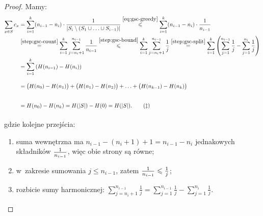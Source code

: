 \begin{obowiazkowy}
\begin{proof}
		Mamy:
		\begin{align*}
			\sum_{x \in S} c_x & = \sum_{i = 1}^{k} (n_{i-1} - n_i) \cdot \frac{1}{|S_i \setminus (S_1 \cup \ldots \cup S_{i-1})|} \overset{\eqref{eq:gsc-greedy}}{\leq} \sum_{i = 1}^{k} (n_{i-1} - n_i) \cdot \frac{1}{n_{i-1}}                                                                                                                                       \\
			                   & \overset{\ref{step:gsc-count}}{=} \sum_{i = 1}^{k} \sum_{j = n_i + 1}^{n_{i-1}} \frac{1}{n_{i-1}} \overset{\ref{step:gsc-bound}}{\leq} \sum_{i = 1}^{k} \sum_{j = n_i + 1}^{n_{i-1}} \frac{1}{j} \overset{\ref{step:gsc-split}}{=} \sum_{i = 1}^{k} \left( \sum_{j = 1}^{n_{i-1}} \frac{1}{j} - \sum_{j = 1}^{n_i} \frac{1}{j} \right) \\
			                   & = \sum_{i = 1}^{k} \left( H(n_{i-1}) - H(n_i) \right)                                                                                                                                                                                                                                                                                  \\
			                   & = \vphantom{\sum_{i = 1}^{k} \left( H(n_{i-1}) - H(n_i) \right)}\big( H(n_0) - H(n_1) \big) + \big( H(n_1) - H(n_2) \big) + \ldots + \big( H(n_{k-1}) - H(n_k) \big)                                                                                                                                                                   \\
			                   & = \vphantom{\sum_{i = 1}^{k} \left( H(n_{i-1}) - H(n_i) \right)} H(n_0) - H(n_k) = H(|S|) - H(0) = H(|S|). \tag{$\ddagger$}\label{eq:gsc-cost}
		\end{align*}
		gdzie kolejne przejścia:
		\begin{enumerate}[label=(\arabic*), nosep]
			\item\label{step:gsc-count} suma wewnętrzna ma $n_{i-1} - (n_i + 1) + 1 = n_{i-1} - n_i$ jednakowych składników $\frac{1}{n_{i-1}}\vphantom{\sum_{j = n_i + 1}^{n_{i-1}}}$, więc obie strony są równe;
			\item\label{step:gsc-bound} w~zakresie sumowania $j \leq n_{i-1}$, zatem $\frac{1}{n_{i-1}} \leq \frac{1}{j}\vphantom{\sum_{j = n_i + 1}^{n_{i-1}}}$;
			\item\label{step:gsc-split} rozbicie sumy harmonicznej: $\sum_{j = n_i + 1}^{n_{i-1}} \frac{1}{j} = \sum_{j = 1}^{n_{i-1}} \frac{1}{j} - \sum_{j = 1}^{n_i} \frac{1}{j}$.
		\end{enumerate}


\end{proof}
\end{obowiazkowy}
